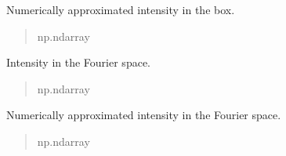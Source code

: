 \documentclass[letterpaper,10pt,english]{sphinxmanual}
\begin{document}
\begin{fulllineitems}
\begin{fulllineitems}
\begin{quote}
\begin{description}
\end{description}\end{quote}

\end{fulllineitems}


\begin{fulllineitems}
\label{\detokenize{source/Box:Box.Box.numerically_approximated_intensity}}
\pysigstartsignatures
\pysigline
{}
\pysigstopsignatures
\sphinxAtStartPar
Numerically approximated intensity in the box.
\begin{quote}\begin{description}
\sphinxAtStartPar
np.ndarray

\end{description}\end{quote}

\end{fulllineitems}


\begin{fulllineitems}
\label{\detokenize{source/Box:Box.Box.intensity_fourier_space}}
\pysigstartsignatures
\pysigline
{}
\pysigstopsignatures
\sphinxAtStartPar
Intensity in the Fourier space.
\begin{quote}\begin{description}
\sphinxAtStartPar
np.ndarray

\end{description}\end{quote}

\end{fulllineitems}


\begin{fulllineitems}
\label{\detokenize{source/Box:Box.Box.numerically_approximated_intensity_fourier_space}}
\pysigstartsignatures
\pysigline
{}
\pysigstopsignatures
\sphinxAtStartPar
Numerically approximated intensity in the Fourier space.
\begin{quote}\begin{description}
\sphinxAtStartPar
np.ndarray


\end{description}
\end{quote}
\end{fulllineitems}
\end{fulllineitems}
\end{document}
